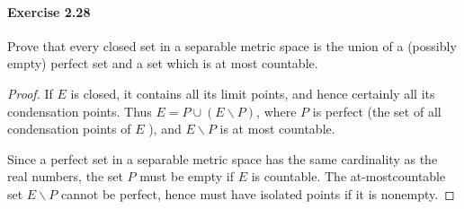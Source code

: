 \documentclass{article}
\theoremstyle{definition}
\begin{document}
\paragraph{Exercise 2.28} Prove that every closed set in a separable metric space is the union of a (possibly empty) perfect set and a set which is at most countable.
\begin{proof}
    If $E$ is closed, it contains all its limit points, and hence certainly all its condensation points. Thus $E=P \cup(E \backslash P)$, where $P$ is perfect (the set of all condensation points of $E$ ), and $E \backslash P$ is at most countable.

Since a perfect set in a separable metric space has the same cardinality as the real numbers, the set $P$ must be empty if $E$ is countable. The at-mostcountable set $E \backslash P$ cannot be perfect, hence must have isolated points if it is nonempty.
\end{proof}
\end{document}
